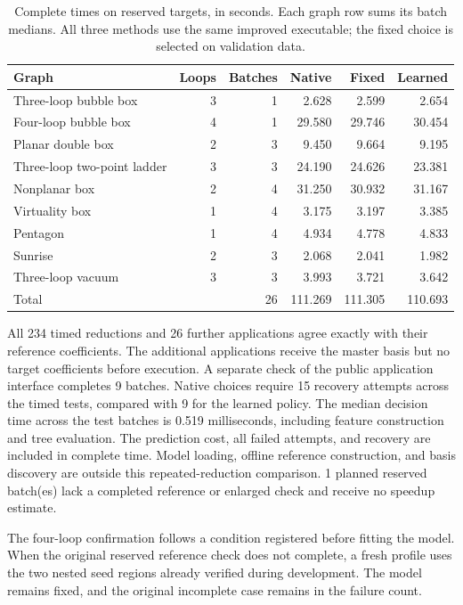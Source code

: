 \begin{table}[!htbp]\centering\small
\caption{Complete times on reserved targets, in seconds. Each graph row sums its batch medians. All three methods use the same improved executable; the fixed choice is selected on validation data.}
\label{tab:adaptive-results}
\begin{tabular}{@{}lrrrrr@{}}\toprule
Graph & Loops & Batches & Native & Fixed & Learned\\\midrule
Three-loop bubble box & 3 & 1 & 2.628 & 2.599 & 2.654\\
Four-loop bubble box & 4 & 1 & 29.580 & 29.746 & 30.454\\
Planar double box & 2 & 3 & 9.450 & 9.664 & 9.195\\
Three-loop two-point ladder & 3 & 3 & 24.190 & 24.626 & 23.381\\
Nonplanar box & 2 & 4 & 31.250 & 30.932 & 31.167\\
Virtuality box & 1 & 4 & 3.175 & 3.197 & 3.385\\
Pentagon & 1 & 4 & 4.934 & 4.778 & 4.833\\
Sunrise & 2 & 3 & 2.068 & 2.041 & 1.982\\
Three-loop vacuum & 3 & 3 & 3.993 & 3.721 & 3.642\\
\midrule Total & & 26 & 111.269 & 111.305 & 110.693\\\bottomrule
\end{tabular}\end{table}

All 234 timed reductions and 26 further applications agree exactly with their reference coefficients. The additional applications receive the master basis but no target coefficients before execution. A separate check of the public application interface completes 9 batches. Native choices require 15 recovery attempts across the timed tests, compared with 9 for the learned policy. The median decision time across the test batches is 0.519 milliseconds, including feature construction and tree evaluation. The prediction cost, all failed attempts, and recovery are included in complete time. Model loading, offline reference construction, and basis discovery are outside this repeated-reduction comparison. 1 planned reserved batch(es) lack a completed reference or enlarged check and receive no speedup estimate.

The four-loop confirmation follows a condition registered before fitting the model. When the original reserved reference check does not complete, a fresh profile uses the two nested seed regions already verified during development. The model remains fixed, and the original incomplete case remains in the failure count.

